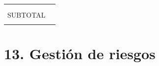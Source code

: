 \documentclass[
11pt, %
]{charter}
\begin{document}
\begin{table}[htpb]
\begin{tabularx}{\linewidth}{@{}|X|c|r|r|@{}}
                                                                &
    \\ \hline
    \multicolumn{1}{|l|}{}                                      &
                                                                &
                                                                &
    \\ \hline
    \multicolumn{1}{|l|}{}                                      &
                                                                &
                                                                &
    \\ \hline
    \multicolumn{3}{|c|}{SUBTOTAL}                              &
    \multicolumn{1}{c|}{}                                           \\ \hline
    \rowcolor[HTML]{C0C0C0}
    \multicolumn{3}{|c|}{TOTAL}                                 &
    \\ \hline
  \end{tabularx}%
\end{table}


\section{13. Gestión de riesgos}
\label{sec:riesgos}
\end{document}
